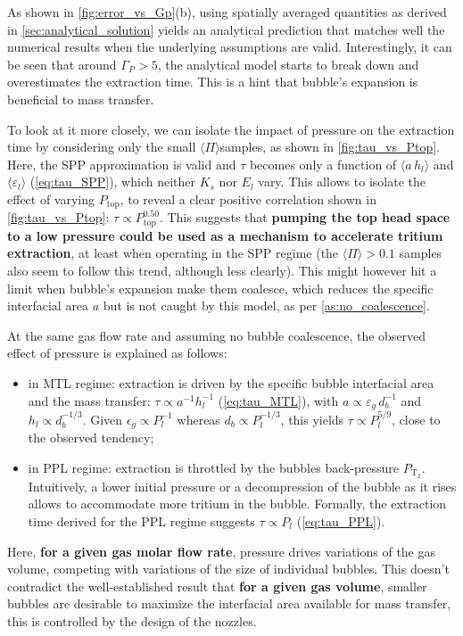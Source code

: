 \documentclass[a4paper,11pt,oneside]{report}
\newcommand{\PT}{\ensuremath{P_\mathrm{T_2}}}
\newcommand{\Gp}{\ensuremath{\Gamma_P}}
\newcommand{\PI}{\ensuremath{\langle \Pi \rangle}}
\newcounter{assumption}[chapter]
\begin{document}
As shown in \cref{fig:error_vs_Gp}(b), using spatially averaged quantities as derived in \cref{sec:analytical_solution} yields an analytical prediction that matches well the numerical results when the underlying assumptions are valid. Interestingly, it can be seen that around $\Gp> 5$, the analytical model starts to break down and overestimates the extraction time. This is a hint that bubble's expansion is beneficial to mass transfer. 

To look at it more closely, we can isolate the impact of pressure on the extraction time by considering only the small \PI samples, as shown in \cref{fig:tau_vs_Ptop}. Here, the SPP approximation is valid and $\tau$ becomes only a function of $\langle a\,h_l\rangle$ and $\langle\varepsilon_l\rangle$ (\cref{eq:tau_SPP}), which neither $K_s$ nor $E_l$ vary. This allows to isolate the effect of varying $P_\mathrm{top}$, to reveal a clear positive correlation shown in \cref{fig:tau_vs_Ptop}: $\tau\propto P_\mathrm{top}^{0.50}$. This suggests that \textbf{pumping the top head space to a low pressure could be used as a mechanism to accelerate tritium extraction}, at least when operating in the SPP regime (the $\PI>0.1$ samples also seem to follow this trend, although less clearly). This might however hit a limit when bubble's expansion make them coalesce, which reduces the specific interfacial area $a$ but is not caught by this model, as per \cref{as:no_coalescence}.

At the same gas flow rate and assuming no bubble coalescence, the observed effect of pressure is explained as follows:
\begin{itemize}
    \item in MTL regime: extraction is driven by the specific bubble interfacial area and the mass transfer: $\tau \propto a^{-1}h_l^{-1}$ (\cref{eq:tau_MTL}), with $a\propto \varepsilon_g \,d_b^{-1}$ and $h_l \propto d_b^{-1/3}$. Given $\epsilon_g\propto P_l^{-1}$ whereas $d_b\propto P_l^{-1/3}$, this yields $\tau\propto P_l^{5/9}$, close to the observed tendency;
    \item in PPL regime: extraction is throttled by the bubbles back-pressure \PT. Intuitively, a lower initial pressure or a decompression of the bubble as it rises allows to accommodate more tritium in the bubble. Formally, the extraction time derived for the PPL regime suggests $\tau\propto P_l$ (\cref{eq:tau_PPL}).
\end{itemize}
Here, \textbf{for a given gas molar flow rate}, pressure drives variations of the gas volume, competing with variations of the size of individual bubbles. 
This doesn't contradict the well-established result that \textbf{for a given gas volume}, smaller bubbles are desirable to maximize the interfacial area available for mass transfer, this is controlled by the design of the nozzles.  
\end{document}
